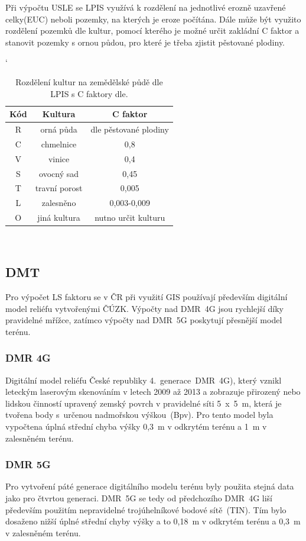 Při výpočtu USLE se LPIS využívá k rozdělení na jednotlivé erozně uzavřené celky(EUC) neboli pozemky, na kterých je eroze počítána. Dále může být využito rozdělení pozemků dle kultur, pomocí kterého je možné určit zakládní C faktor a stanovit pozemky s ornou půdou, pro které je třeba zjistit pěstované plodiny.\cite{Novotny2014}
\begin{table}[!h]
\begin{center}
\catcode`
    \noindent\begin{tabular}{|*{3}{c|}}
\hline
\bf Kód 		& \bf Kultura & \bf C faktor\\
\hline
R & orná půda  & dle pěstované plodiny\\
   \hline                                   
C & chmelnice  & 0,8\\
   \hline                        
V & vinice &  0,4\\
   \hline                              
S & ovocný sad & 0,45\\
   \hline                              
T & travní porost  & 0,005\\
   \hline                              
L & zalesněno  & 0,003-0,009\\
   \hline                                                                                      
O & jiná kultura  &	nutno určit kulturu\\
   \hline
    \end{tabular}\\
  \caption[Rozdělení kultur na zemědělské půdě dle LPIS]{Rozdělení kultur na zemědělské půdě dle LPIS\cite{lpis} s C faktory dle\cite{janecek2012}.}
  \label{tabulka_ohrozenost}
\end{center}
\end{table}
\FloatBarrier
\subsection{DMT}
Pro výpočet LS faktoru se v ČR při využití GIS používají především digitální model reliéfu vytvořenými ČÚZK\cite{cuzk}. Výpočty nad DMR~4G jsou rychlejší díky pravidelné mřížce, zatímco výpočty nad DMR~5G poskytují přesnější model terénu.
\subsubsection{DMR 4G}
Digitální model reliéfu České republiky 4.~generace~DMR~4G), který vznikl leteckým laserovým skenováním v letech 2009 až 2013 a zobrazuje přirozený nebo lidskou činností upravený zemský povrch v pravidelné síti 5~x~5~m, která je tvořena body s~určenou nadmořskou výškou~(Bpv). Pro tento model byla vypočtena úplná střední chyba výšky 0,3~m v odkrytém terénu a 1~m v zalesněném terénu. 
\subsubsection{DMR 5G}
Pro vytvoření páté generace digitálního modelu terénu byly použita stejná data jako pro čtvrtou generaci. DMR~5G se tedy od předchozího DMR~4G liší především použitím nepravidelné trojúhelníkové bodové sítě~(TIN). Tím bylo dosaženo nižší úplné střední chyby výšky a to 0,18~m v odkrytém terénu a 0,3~m v zalesněném terénu.
